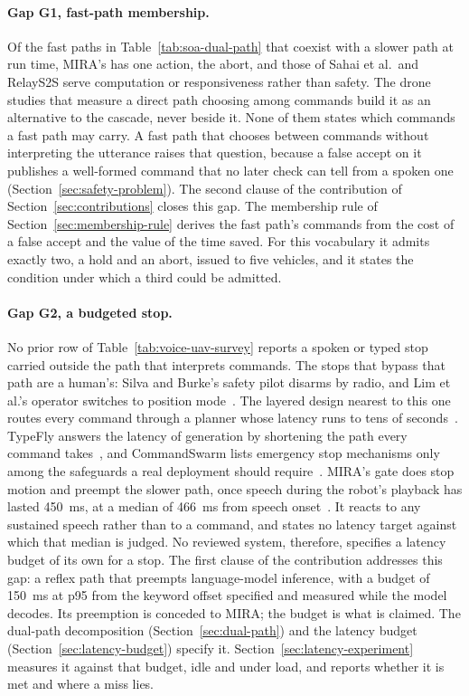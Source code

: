 \paragraph{Gap G1, fast-path membership.} Of the fast paths in Table~\ref{tab:soa-dual-path} that
coexist with a slower path at run time, MIRA's has one action, the abort, and those of Sahai et al.\
and RelayS2S serve computation or responsiveness rather than safety. The drone studies that measure
a direct path choosing among commands build it as an alternative to the cascade, never beside it.
None of them states which commands a fast path may carry. A fast path that chooses between commands
without interpreting the utterance raises that question, because a false accept on it publishes a
well-formed command that no later check can tell from a spoken one
(Section~\ref{sec:safety-problem}). The second clause of the contribution of
Section~\ref{sec:contributions} closes this gap. The membership rule of
Section~\ref{sec:membership-rule} derives the fast path's commands from the cost of a false accept
and the value of the time saved. For this vocabulary it admits exactly two, a hold and an abort,
issued to five vehicles, and it states the condition under which a third could be admitted.

\paragraph{Gap G2, a budgeted stop.} No prior row of Table~\ref{tab:voice-uav-survey} reports a
spoken or typed stop carried outside the path that interprets commands. The stops that bypass that
path are a human's: Silva and Burke's safety pilot disarms by radio, and Lim et al.'s operator
switches to position mode~\cite{silva2026,lim2025}. The layered design nearest to this one routes
every command through a planner whose latency runs to tens of seconds~\cite{skysim2026}. TypeFly
answers the latency of generation by shortening the path every command takes~\cite{typefly2024}, and
CommandSwarm lists emergency stop mechanisms only among the safeguards a real deployment should
require~\cite{commandswarm2026}. MIRA's gate does stop motion and preempt the slower path, once
speech during the robot's playback has lasted 450~ms, at a median of 466~ms from speech
onset~\cite{mira}. It reacts to any sustained speech rather than to a command, and states no latency
target against which that median is judged. No reviewed system, therefore, specifies a latency budget
of its own for a stop. The first clause of the contribution addresses this gap: a reflex path that
preempts language-model inference, with a budget of 150~ms at p95 from the keyword offset specified
and measured while the model decodes. Its preemption is conceded to MIRA; the budget is what is claimed.
The dual-path decomposition (Section~\ref{sec:dual-path}) and the latency budget
(Section~\ref{sec:latency-budget}) specify it. Section~\ref{sec:latency-experiment} measures it
against that budget, idle and under load, and reports whether it is met and where a miss lies.

